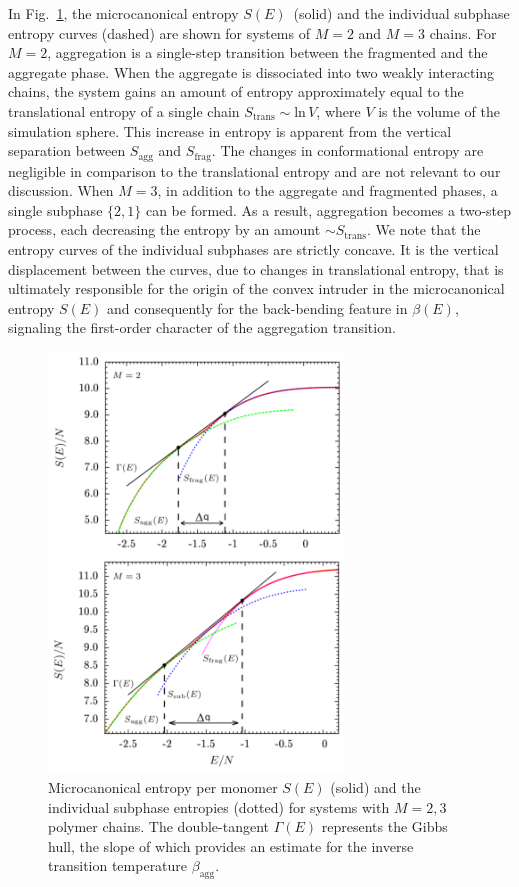 \documentclass[12pt]{report}
\begin{document}
%
In Fig.~\ref{fig:agg_entropies}, the microcanonical entropy $S(E)$~(solid) and the individual subphase entropy curves (dashed) are shown for systems of $M = 2$ and $M = 3$ chains. For $M=2$, aggregation is a single-step transition between the fragmented and the aggregate phase. When the aggregate is dissociated into two weakly interacting chains, the system gains an amount of entropy approximately equal to the translational entropy of a single chain $S_{\mathrm{trans}} \sim \mathrm{ln}\,V$, where $V$ is the volume of the simulation sphere. This increase in entropy is apparent from the vertical separation between $S_{\mathrm{agg}}$ and $S_{\mathrm{frag}}$. The changes in conformational entropy are negligible in comparison to the translational entropy and are not relevant to our discussion.  When $M = 3$, in addition to the aggregate and fragmented phases, a single subphase $\{2,1\}$ can be formed. As a result, aggregation becomes a two-step process, each decreasing the entropy by an amount $\sim S_{\mathrm{trans}}$. We note that the entropy curves of the individual subphases are strictly concave. It is the vertical displacement between the curves, due to changes in translational entropy, that is ultimately responsible for the origin  of the convex intruder in the microcanonical entropy $S(E)$ and consequently for the back-bending feature in $\beta(E)$, signaling the first-order character of the aggregation transition. 
%
%
\begin{figure}
\center
\includegraphics[width = 0.70\textwidth]{chapter7Figs/entropyCombined.eps}
\vspace{3mm}
\caption{\label{fig:agg_entropies} Microcanonical entropy per monomer $S(E)$ (solid) and the individual subphase entropies (dotted) for systems with $M = 2,3$ polymer chains. The double-tangent $\Gamma (E)$ represents the Gibbs hull, the slope of which provides an estimate for the inverse transition temperature $\beta_{\mathrm{agg}}$.}
\end{figure}
%
\end{document}
